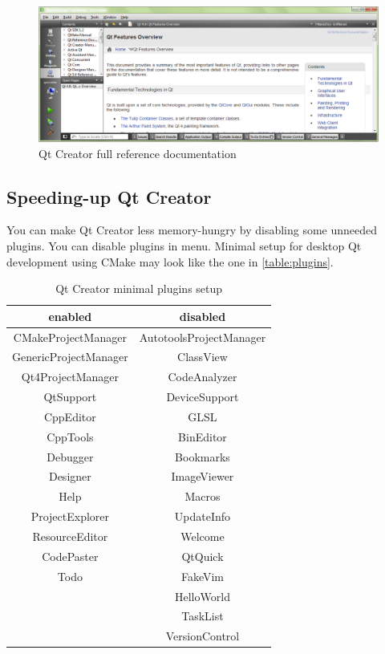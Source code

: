 \begin{figure}[ht]
\centering
\includegraphics[width=14.5cm]{graphics/laboratory/06-qtcreator-help-full.png}
\caption{Qt Creator full reference documentation}\label{figure:qtcreatorhelpfull}
\end{figure}

\subsection{Speeding-up Qt Creator}
You can make Qt Creator less memory-hungry by disabling some unneeded plugins. You can disable plugins in menu. Minimal setup for desktop Qt development using CMake may look like the one in \autoref{table:plugins}.

\begin{table}[ht]
\begin{center}
\caption{Qt Creator minimal plugins setup}\label{table:plugins}
\begin{tabular}{c | c}
enabled & disabled \\
\hline
CMakeProjectManager & AutotoolsProjectManager \\
GenericProjectManager & ClassView \\
Qt4ProjectManager & CodeAnalyzer \\
QtSupport & DeviceSupport \\
CppEditor & GLSL \\
CppTools & BinEditor \\
Debugger & Bookmarks \\
Designer & ImageViewer \\
Help & Macros \\
ProjectExplorer & UpdateInfo \\
ResourceEditor & Welcome \\
CodePaster & QtQuick \\
Todo & FakeVim \\
 & HelloWorld \\
 & TaskList \\
 & VersionControl 
\end{tabular}
\end{center}
\end{table}


